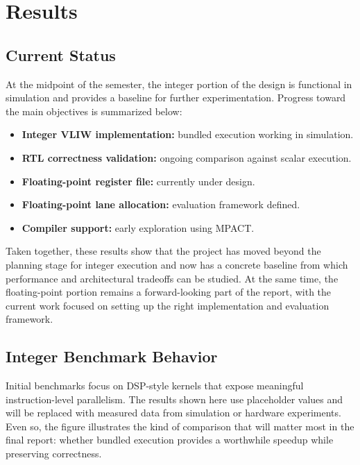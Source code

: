 \documentclass[conference,a4paper]{IEEEtran}
\begin{document}
\section{Results}

\subsection{Current Status}

At the midpoint of the semester, the integer portion of the design is functional in simulation and provides a baseline for further experimentation. Progress toward the main objectives is summarized below:

\begin{itemize}
    \item \textbf{Integer VLIW implementation:} bundled execution working in simulation.
    \item \textbf{RTL correctness validation:} ongoing comparison against scalar execution.
    \item \textbf{Floating-point register file:} currently under design.
    \item \textbf{Floating-point lane allocation:} evaluation framework defined.
    \item \textbf{Compiler support:} early exploration using MPACT.
\end{itemize}

Taken together, these results show that the project has moved beyond the planning stage for integer execution and now has a concrete baseline from which performance and architectural tradeoffs can be studied. At the same time, the floating-point portion remains a forward-looking part of the report, with the current work focused on setting up the right implementation and evaluation framework.

\subsection{Integer Benchmark Behavior}

Initial benchmarks focus on DSP-style kernels that expose meaningful instruction-level parallelism. The results shown here use placeholder values and will be replaced with measured data from simulation or hardware experiments. Even so, the figure illustrates the kind of comparison that will matter most in the final report: whether bundled execution provides a worthwhile speedup while preserving correctness.
\end{document}
